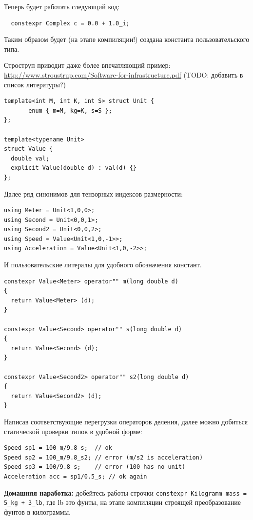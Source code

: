 \documentclass[a4paper,12pt,oneside]{book}
\begin{document}
Теперь будет работать следующий код:

\begin{lstlisting}
  constexpr Complex c = 0.0 + 1.0_i;
\end{lstlisting}

Таким образом будет (на этапе компиляции!) создана константа пользовательского типа.

Строструп приводит даже более впечатляющий пример: \url{http://www.stroustrup.com/Software-for-infrastructure.pdf} (TODO: добавить в список литературы?)

\begin{lstlisting}
template<int M, int K, int S> struct Unit {
       enum { m=M, kg=K, s=S };
};

template<typename Unit> 
struct Value {
  double val; 
  explicit Value(double d) : val(d) {}
};
\end{lstlisting}

Далее ряд синонимов для тензорных индексов размерности:

\begin{lstlisting}
using Meter = Unit<1,0,0>;
using Second = Unit<0,0,1>;
using Second2 = Unit<0,0,2>; 
using Speed = Value<Unit<1,0,-1>>; 
using Acceleration = Value<Unit<1,0,-2>>;
\end{lstlisting}

И пользовательские литералы для удобного обозначения констант.

\begin{lstlisting}
constexpr Value<Meter> operator"" m(long double d)
{
  return Value<Meter> (d);
}   

constexpr Value<Second> operator"" s(long double d)
{
  return Value<Second> (d);  
}   

constexpr Value<Second2> operator"" s2(long double d)
{
  return Value<Second2> (d); 
}
\end{lstlisting}

Написав соответствующие перегрузки операторов деления, далее можно добиться статической проверки типов в удобной форме:

\begin{lstlisting}
Speed sp1 = 100_m/9.8_s;  // ok
Speed sp2 = 100_m/9.8_s2; // error (m/s2 is acceleration)
Speed sp3 = 100/9.8_s;    // error (100 has no unit)
Acceleration acc = sp1/0.5_s; // ok again
\end{lstlisting}

\textbf{Домашняя наработка:} добейтесь работы строчки \lstinline!constexpr Kilogramm mass = 5_kg + 3_lb!, где lb это фунты, на этапе компиляции строящей преобразование фунтов в килограммы.
\end{document}
